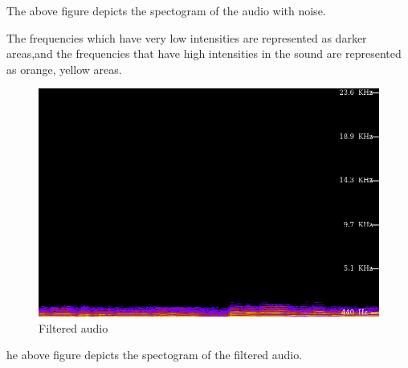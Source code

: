 \documentclass[journal,12pt,twocolumn]{IEEEtran}
\theoremstyle{remark}
\begin{document}
\begin{enumerate}
The above figure depicts the spectogram of the audio with noise.


The frequencies which have very low intensities are represented as darker areas,and the frequencies that have high intensities in the sound are represented as orange, yellow areas.

\begin{figure}[H]
\includegraphics[width=1\columnwidth]{figs/filtered.46.png}
    \caption{Filtered audio}
\end{figure}
\end{enumerate}
he above figure depicts the spectogram of the filtered audio.
\end{document}
